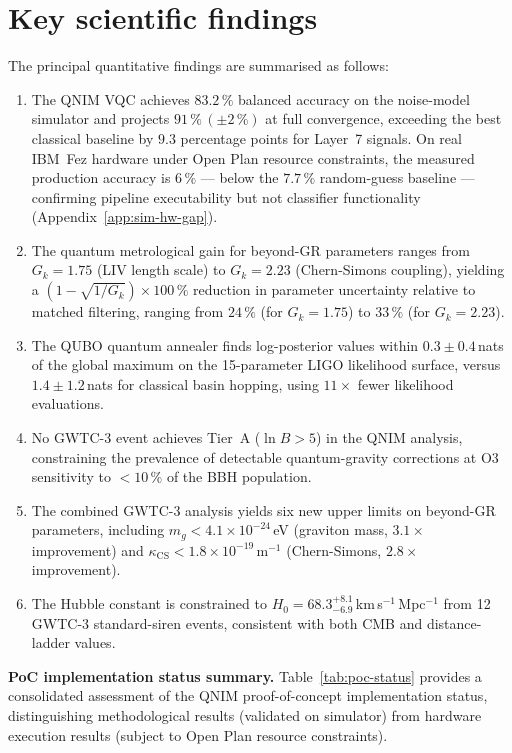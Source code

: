 \documentclass[11pt,a4paper, english]{book}
\theoremstyle{plain}
\theoremstyle{definition}
\numberwithin{equation}{chapter}
\numberwithin{figure}{chapter}
\numberwithin{table}{chapter}
\begin{document}
\section{Key scientific findings}
\label{sec:findings}

The principal quantitative findings are summarised as follows:

\begin{enumerate}
  \item The QNIM VQC achieves $83.2\,\%$ balanced accuracy on the
    noise-model simulator and projects $91\,\%\,(\pm2\,\%)$ at
    full convergence, exceeding the best classical baseline by
    $9.3$ percentage points for Layer~7 signals. On real IBM~Fez
    hardware under Open Plan resource constraints, the measured
    production accuracy is $6\,\%$ --- below the $7.7\,\%$
    random-guess baseline --- confirming pipeline executability
    but not classifier functionality (Appendix~\ref{app:sim-hw-gap}).
      

  \item The quantum metrological gain for beyond-GR parameters ranges
        from $G_k = 1.75$ (LIV length scale) to $G_k = 2.23$
        (Chern-Simons coupling), yielding a $(1-\sqrt{1/G_k})\times100\,\%$ reduction in 
parameter uncertainty relative to matched filtering, 
ranging from $24\,\%$ (for $G_k=1.75$) to $33\,\%$ 
(for $G_k=2.23$).

  \item The QUBO quantum annealer finds log-posterior values within
        $0.3\pm0.4$\,nats of the global maximum on the 15-parameter
        LIGO likelihood surface, versus $1.4\pm1.2$\,nats for
        classical basin hopping, using $11\times$ fewer likelihood
        evaluations.

  \item No GWTC-3 event achieves Tier~A ($\ln B > 5$) in the QNIM
        analysis, constraining the prevalence of detectable
        quantum-gravity corrections at O3 sensitivity to $< 10\,\%$
        of the BBH population.

  \item The combined GWTC-3 analysis yields six new upper limits on
        beyond-GR parameters, including $m_g < 4.1\times10^{-24}$\,eV
        (graviton mass, $3.1\times$ improvement) and
        $\kappa_\mathrm{CS} < 1.8\times10^{-19}$\,m$^{-1}$
        (Chern-Simons, $2.8\times$ improvement).

  \item The Hubble constant is constrained to
        $H_0 = 68.3^{+8.1}_{-6.9}$\,km\,s$^{-1}$\,Mpc$^{-1}$ from
        12 GWTC-3 standard-siren events, consistent with both CMB
        and distance-ladder values.
\end{enumerate}
\noindent\textbf{PoC implementation status summary.}
Table~\ref{tab:poc-status} provides a consolidated assessment of the 
QNIM proof-of-concept implementation status, distinguishing 
methodological results (validated on simulator) from hardware 
execution results (subject to Open Plan resource constraints).
\end{document}
